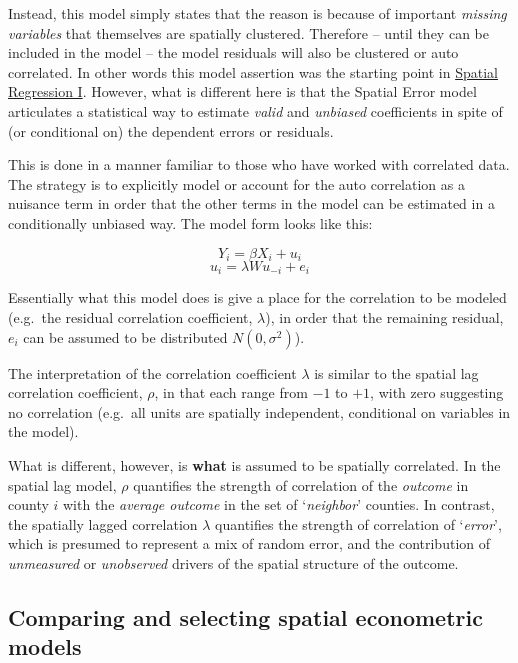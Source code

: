 \documentclass[
]{book}
\begin{document}
Instead, this model simply states that the reason is because of important \emph{missing variables} that themselves are spatially clustered. Therefore -- until they can be included in the model -- the model residuals will also be clustered or auto correlated. In other words this model assertion was the starting point in \protect\hyperlink{spatreg1}{Spatial Regression I}. However, what is different here is that the Spatial Error model articulates a statistical way to estimate \emph{valid} and \emph{unbiased} coefficients in spite of (or conditional on) the dependent errors or residuals.

This is done in a manner familiar to those who have worked with correlated data. The strategy is to explicitly model or account for the auto correlation as a nuisance term in order that the other terms in the model can be estimated in a conditionally unbiased way. The model form looks like this:

\[Y_i=\beta X_i+ u_i\]
\[u_i=\lambda Wu_{-i} + e_i\]

Essentially what this model does is give a place for the correlation to be modeled (e.g.~the residual correlation coefficient, \(\lambda\)), in order that the remaining residual, \(e_i\) can be assumed to be distributed \(N(0, \sigma^2)\)).

The interpretation of the correlation coefficient \(\lambda\) is similar to the spatial lag correlation coefficient, \(\rho\), in that each range from \(-1\) to \(+1\), with zero suggesting no correlation (e.g.~all units are spatially independent, conditional on variables in the model).

What is different, however, is \textbf{what} is assumed to be spatially correlated. In the spatial lag model, \(\rho\) quantifies the strength of correlation of the \emph{outcome} in county \(i\) with the \emph{average outcome} in the set of `\emph{neighbor}' counties. In contrast, the spatially lagged correlation \(\lambda\) quantifies the strength of correlation of `\emph{error}', which is presumed to represent a mix of random error, and the contribution of \emph{unmeasured} or \emph{unobserved} drivers of the spatial structure of the outcome.

\hypertarget{comparing-and-selecting-spatial-econometric-models}{%
\subsection{Comparing and selecting spatial econometric models}\label{comparing-and-selecting-spatial-econometric-models}}
\end{document}
